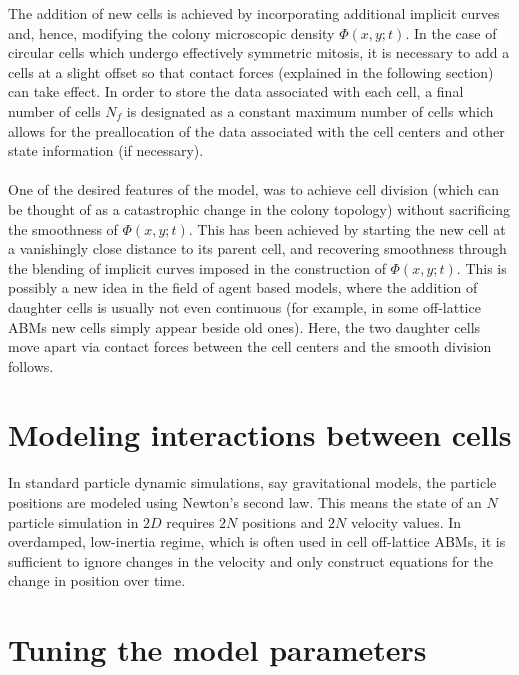 The addition of new cells is achieved by incorporating additional implicit curves and, hence, modifying the colony microscopic density $\Phi(x,y;t) $. In the case of circular cells which undergo effectively symmetric mitosis, it is necessary to add a cells at a slight offset so that contact forces (explained in the following section) can take effect. In order to store the data associated with each cell, a final number of cells $N_f$ is designated as a constant maximum number of cells which allows for the preallocation of the data associated with the cell centers and other state information (if necessary). 
\\
\\
One of the desired features of the model, was to achieve cell division (which can be thought of as a catastrophic change in the colony topology)  without sacrificing the smoothness of $\Phi(x,y;t) $. This has been achieved by starting the new cell at a vanishingly close distance to its parent cell, and recovering smoothness through the blending of implicit curves imposed in the construction of $\Phi(x,y;t)$. This is possibly a new idea in the field of agent based models, where the addition of daughter cells is usually not even continuous (for example, in some off-lattice ABMs new cells simply appear beside old ones). Here, the two daughter cells move apart via contact forces between the cell centers and the smooth division follows.

\section{Modeling interactions between cells}
In standard particle dynamic simulations, say gravitational models, the particle positions are modeled using Newton's second law. This means the state of an $N$ particle simulation in $2D$ requires $2N$ positions and $2N$ velocity values. In overdamped, low-inertia regime, which is often used in cell off-lattice ABMs, it is sufficient to ignore changes in the velocity and only construct equations for the change in position over time. 

\section{Tuning the model parameters}

